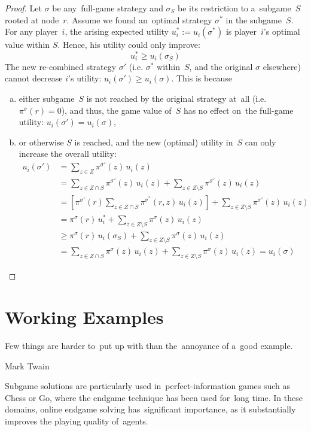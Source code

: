 \begin{proof}
  Let $\sigma$ be any~full-game strategy and $\sigma_S$ be its restriction to a~subgame~$S$ rooted at node~$r$.
  Assume we found an~optimal strategy $\sigma^*$ in the subgame~$S$.
  For any player~$i$, the arising expected utility $u^*_i := u_i(\sigma^*)$ is player~$i$'s optimal value within $S$.
  Hence, his utility could only improve:
  \begin{equation}
    u^*_i \ge u_i(\sigma_S)
    \label{eq:TODO}
  \end{equation}
  The new re-combined strategy $\sigma'$ (i.e. $\sigma^*$ within~$S$, and the original $\sigma$ elsewhere) cannot decrease $i$'s utility:
  $u_i(\sigma') \ge u_i(\sigma)$.
  This is because
  \begin{enumerate}[(a)]
    \item either subgame~$S$ is not reached by the original strategy at~all (i.e. $\pi^\sigma(r) = 0$), and thus, the game value of~$S$ has no effect on~the full-game utility:
      $u_i(\sigma') = u_i(\sigma)$,
    \item or otherwise $S$ is reached, and the new (optimal) utility in~$S$ can only increase the overall utility:
      \begin{align*}
        u_i(\sigma')
        &= \sum _{z \in Z} \pi^{\sigma'}\!(z) \,u_i(z) \\
        &= \sum _{z \in Z \cap S} \pi^{\sigma'}\!(z) \,u_i(z)
        + \sum _{z \in Z \setminus S} \pi^{\sigma'}\!(z) \,u_i(z) \\
        &= \left[ \pi^{\sigma'}\!(r)\sum _{z \in Z \cap S} \pi^{\sigma^*}\!(r, z) \,u_i(z) \right]
        + \sum _{z \in Z \setminus S} \pi^{\sigma'}\!(z) \,u_i(z) \\
        &= \pi^{\sigma}\!(r) \,u_i^*
        + \sum _{z \in Z \setminus S} \pi^{\sigma}\!(z) \,u_i(z) \\
        &\ge \pi^{\sigma}\!(r) \,u_i(\sigma_S)
        + \sum _{z \in Z \setminus S} \pi^{\sigma}\!(z) \,u_i(z) \\
        &= \sum _{z \in Z \cap S} \pi^{\sigma}\!(z) \,u_i(z)
        + \sum _{z \in Z \setminus S} \pi^{\sigma}\!(z) \,u_i(z)
        = u_i(\sigma)
      \end{align*}
  \end{enumerate}
\end{proof}

\section{Working Examples}
\epigraph{
  Few things are harder to~put up with than the~annoyance of a~good example.
}{Mark Twain}
Subgame solutions are particularly used in~perfect-information games such as Chess or Go, where the endgame technique has been used for~long time.
In these domains, online endgame solving has~significant importance, as it substantially improves the playing quality of~agents.

